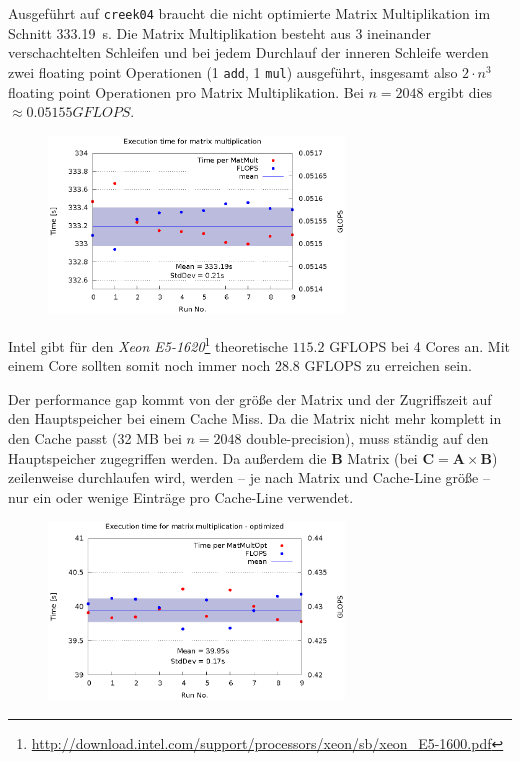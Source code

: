 \documentclass[a4paper,11pt]{scrartcl}
\begin{document}
Ausgeführt auf \verb+creek04+ braucht die nicht optimierte Matrix Multiplikation im Schnitt \SI{333.19}{\second}. Die Matrix Multiplikation besteht aus 3 ineinander verschachtelten Schleifen und bei jedem Durchlauf der inneren Schleife werden zwei floating point Operationen (1 \verb+add+, 1 \verb+mul+) ausgeführt, insgesamt also $2\cdot n^3$ floating point Operationen pro Matrix Multiplikation. Bei $n=2048$ ergibt dies $\approx 0.05155 GFLOPS$. 

\begin{figure}[!ht]
    \centering
    \includegraphics[width=0.7\textwidth,keepaspectratio]{2_3/data/matmult.eps}
\end{figure}

Intel gibt für den \emph{Xeon E5-1620}\footnote{\url{http://download.intel.com/support/processors/xeon/sb/xeon_E5-1600.pdf}} theoretische $115.2$ GFLOPS bei 4 Cores an. Mit einem Core sollten somit noch immer noch $28.8$ GFLOPS zu erreichen sein.

Der performance gap kommt von der größe der Matrix und der Zugriffszeit auf den Hauptspeicher bei einem Cache Miss. Da die Matrix nicht mehr komplett in den Cache passt (32 MB bei $n=2048$ double-precision), muss ständig auf den Hauptspeicher zugegriffen werden. Da außerdem die $\mathbf{B}$ Matrix (bei $\mathbf{C}=\mathbf{A}\times \mathbf{B}$) zeilenweise durchlaufen wird, werden -- je nach Matrix und Cache-Line größe -- nur ein oder wenige Einträge pro Cache-Line verwendet. \\


\begin{figure}[!ht]
    \centering
    \includegraphics[width=0.7\textwidth,keepaspectratio]{2_3/data/opt.eps}
\end{figure}
\end{document}

